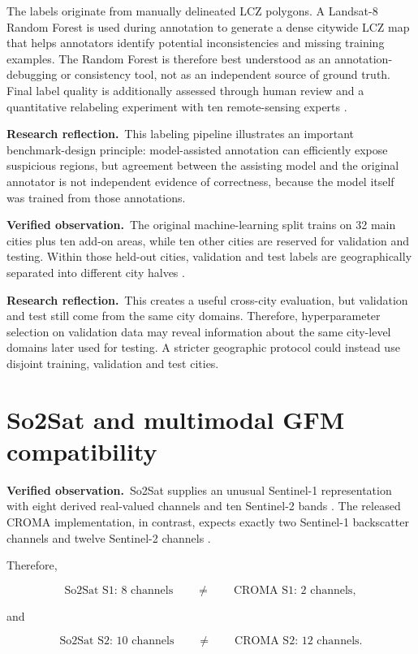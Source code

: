 \documentclass[11pt,a4paper]{article}
\newcommand{\verified}{\textcolor{verifiedgreen}{\textbf{Verified observation.}}}
\newcommand{\reflection}{\textcolor{reflectionorange}{\textbf{Research reflection.}}}
\begin{document}
The labels originate from manually delineated LCZ polygons. A Landsat-8 Random Forest is used
during annotation to generate a dense citywide LCZ map that helps annotators identify
potential inconsistencies and missing training examples. The Random Forest is therefore best
understood as an annotation-debugging or consistency tool, not as an independent source of
ground truth. Final label quality is additionally assessed through human review and a
quantitative relabeling experiment with ten remote-sensing experts \cite{so2sat}.

\reflection\ This labeling pipeline illustrates an important benchmark-design principle:
model-assisted annotation can efficiently expose suspicious regions, but agreement between
the assisting model and the original annotator is not independent evidence of correctness,
because the model itself was trained from those annotations.

\verified\ The original machine-learning split trains on 32 main cities plus ten add-on
areas, while ten other cities are reserved for validation and testing. Within those held-out
cities, validation and test labels are geographically separated into different city halves
\cite{so2sat}.

\reflection\ This creates a useful cross-city evaluation, but validation and test still come
from the same city domains. Therefore, hyperparameter selection on validation data may reveal
information about the same city-level domains later used for testing. A stricter geographic
protocol could instead use disjoint training, validation and test cities.

\section{So2Sat and multimodal GFM compatibility}

\verified\ So2Sat supplies an unusual Sentinel-1 representation with eight derived real-valued
channels and ten Sentinel-2 bands \cite{so2sat}. The released CROMA implementation, in
contrast, expects exactly two Sentinel-1 backscatter channels and twelve Sentinel-2 channels
\cite{croma}.

Therefore,

\[
\text{So2Sat S1: }8\text{ channels}
\qquad\neq\qquad
\text{CROMA S1: }2\text{ channels},
\]

and

\[
\text{So2Sat S2: }10\text{ channels}
\qquad\neq\qquad
\text{CROMA S2: }12\text{ channels}.
\]
\end{document}
